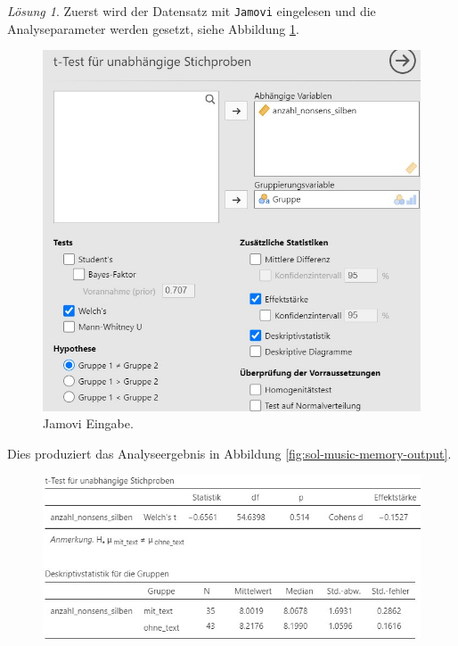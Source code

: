 \documentclass[
]{book}
\theoremstyle{definition}
\theoremstyle{definition}
\theoremstyle{definition}
\theoremstyle{definition}
\theoremstyle{remark}
\newtheorem*{solution}{Lösung}
\begin{document}
\begin{solution}

Zuerst wird der Datensatz mit \texttt{Jamovi} eingelesen und die Analyseparameter werden gesetzt, siehe Abbildung \ref{fig:sol-music-memory-input}.

\begin{figure}

{\centering \includegraphics[width=1\linewidth]{figures/06-exr-music-memory-jmv-input} 

}

\caption{Jamovi Eingabe.}\label{fig:sol-music-memory-input}
\end{figure}

Dies produziert das Analyseergebnis in Abbildung \ref{fig:sol-music-memory-output}.

\begin{figure}

{\centering \includegraphics[width=1\linewidth]{figures/06-exr-music-memory-jmv-output} 

}
\end{figure}
\end{solution}
\end{document}

